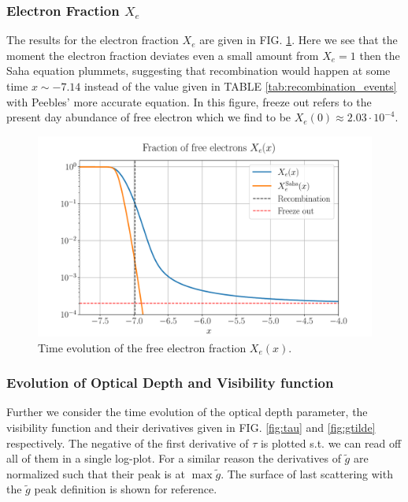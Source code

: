 \documentclass[%
reprint,
 amsmath,amssymb,
 aps,
]{revtex4-2}
\begin{document}
\subsubsection{Electron Fraction $X_e$}
The results for the electron fraction $X_e$ are given in FIG. \ref{fig:Xe}. Here we see that the moment the electron fraction deviates even a small amount from $X_e=1$ then the Saha equation plummets, suggesting that recombination would happen at some time $x\sim-7.14$ instead of the value given in TABLE \ref{tab:recombination_events} with Peebles' more accurate equation. In this figure, freeze out refers to the present day abundance of free electron which we find to be $X_e(0)\approx2.03\cdot10^{-4}$. 
\begin{figure}[ht!]
\includegraphics[width = \linewidth]{Figures/Xe.pdf}
\caption{Time evolution of the free electron fraction $X_e(x)$.}
\label{fig:Xe}
\end{figure}
\subsubsection{Evolution of Optical Depth and Visibility function}
Further we consider the time evolution of the optical depth parameter, the visibility function and their derivatives given in FIG. \ref{fig:tau} and \ref{fig:gtilde} respectively. The negative of the first derivative of $\tau$ is plotted s.t. we can read off all of them in a single log-plot. For a similar reason the derivatives of $\tilde g$ are normalized such that their peak is at $\max\tilde g$. The surface of last scattering with the $\tilde g$ peak definition is shown for reference. 
\end{document}
